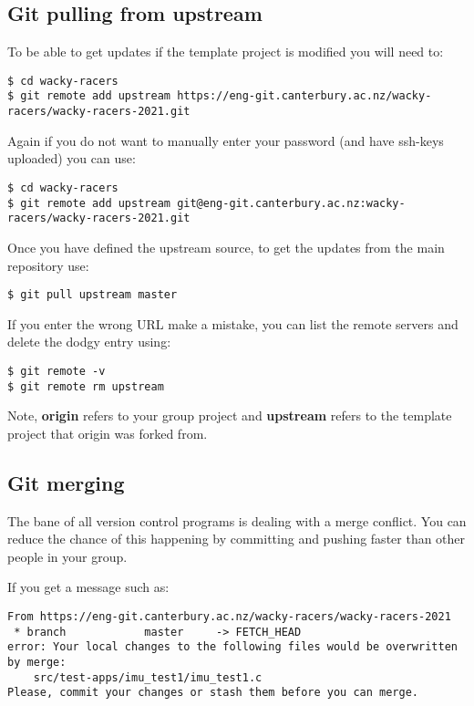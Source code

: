\subsection{Git pulling from upstream}
\label{git-pulling-from-upstream}

To be able to get updates if the template project is modified you will
need to:

\begin{verbatim}
$ cd wacky-racers 
$ git remote add upstream https://eng-git.canterbury.ac.nz/wacky-racers/wacky-racers-2021.git  
\end{verbatim}

Again if you do not want to manually enter your password (and have
ssh-keys uploaded) you can use:
%
\begin{verbatim}
$ cd wacky-racers 
$ git remote add upstream git@eng-git.canterbury.ac.nz:wacky-racers/wacky-racers-2021.git
\end{verbatim}

Once you have defined the upstream source, to get the updates from the
main repository use:
%
\begin{verbatim}
$ git pull upstream master
\end{verbatim}

If you enter the wrong URL make a mistake, you can list the remote
servers and delete the dodgy entry using:

\begin{verbatim}
$ git remote -v
$ git remote rm upstream
\end{verbatim}

Note, \textbf{origin} refers to your group project and \textbf{upstream}
refers to the template project that origin was forked from.

\subsection{Git merging}
\label{git-merging}

The bane of all version control programs is dealing with a merge
conflict. You can reduce the chance of this happening by committing and
pushing faster than other people in your group.

If you get a message such as:

\begin{verbatim}
From https://eng-git.canterbury.ac.nz/wacky-racers/wacky-racers-2021
 * branch            master     -> FETCH_HEAD
error: Your local changes to the following files would be overwritten by merge:
    src/test-apps/imu_test1/imu_test1.c
Please, commit your changes or stash them before you can merge.
\end{verbatim}

